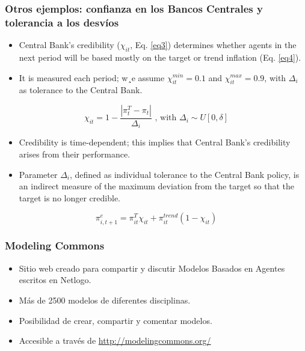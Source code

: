 \documentclass[11pt]{beamer}
\begin{document}
\begin{frame}
	\frametitle{Otros ejemplos: confianza en los Bancos Centrales y tolerancia a los desvíos}
\begin{itemize}
\small	\item Central Bank's credibility ($\chi_{it}$, Eq. \eqref{eq3}) determines whether agents in the next period will be based mostly on the target or trend inflation (Eq. \eqref{eq4}).
	\item It is measured each period; w¸e assume $\chi^{min}_{it} = 0.1 $ and $\chi^{max}_{it}=0.9$, with $\Delta_{i}$ as tolerance to the Central Bank. 
\end{itemize} 

\begin{equation}
\chi_{it}= 1-\dfrac{|\pi^T_t-\pi_t|}{\Delta_{i}}\text{ , with } \Delta_{i}\sim U[0,\delta]
\label{eq3}
\end{equation}

\begin{itemize}
\small	\item Credibility is time-dependent; this implies that Central Bank's credibility arises from their performance.
	\item  Parameter $\Delta_{i}$, defined as individual tolerance to the Central Bank policy, is an indirect measure of the maximum deviation from the target so that the target is no longer credible.
\end{itemize} 

\begin{equation}
\pi^e_{i,t+1} = \pi^T_{it} \chi_{it} + \pi^{trend}_{it} (1 - \chi_{it})
\label{eq4}
\end{equation}	
\end{frame}

\begin{frame}
\frametitle{Modeling Commons}
\begin{itemize}
	\item Sitio web creado para compartir y discutir Modelos Basados en Agentes escritos en Netlogo.
	\item Más de 2500 modelos de diferentes disciplinas.
	\item Posibilidad de crear, compartir y comentar modelos.
	\item Accesible a través de \url{http://modelingcommons.org/}
\end{itemize}
\end{frame}
\end{document}
